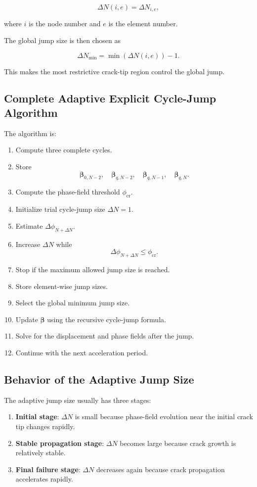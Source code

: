 ﻿\documentclass[11pt,a4paper]{article}
\begin{document}
\[
\Delta N(i,e)
=
\Delta N_{i,e},
\]

where $i$ is the node number and $e$ is the element number.

The global jump size is then chosen as

\[
\Delta N_{\min}
=
\min
\left(
\Delta N(i,e)
\right)
-
1.
\]

This makes the most restrictive crack-tip region control the global jump.

\subsection{Complete Adaptive Explicit Cycle-Jump Algorithm}

The algorithm is:

\begin{enumerate}[leftmargin=*]
    \item Compute three complete cycles.
    \item Store
    \[
    \bm{\beta}_{0,N-2},
    \quad
    \bm{\beta}_{q,N-2},
    \quad
    \bm{\beta}_{q,N-1},
    \quad
    \bm{\beta}_{q,N}.
    \]
    \item Compute the phase-field threshold $\phi_{\mathrm{cr}}$.
    \item Initialize trial cycle-jump size $\Delta N=1$.
    \item Estimate $\Delta \phi_{N+\Delta N}$.
    \item Increase $\Delta N$ while
    \[
    \Delta \phi_{N+\Delta N}\leq \phi_{\mathrm{cr}}.
    \]
    \item Stop if the maximum allowed jump size is reached.
    \item Store element-wise jump sizes.
    \item Select the global minimum jump size.
    \item Update $\bm{\beta}$ using the recursive cycle-jump formula.
    \item Solve for the displacement and phase fields after the jump.
    \item Continue with the next acceleration period.
\end{enumerate}

\subsection{Behavior of the Adaptive Jump Size}

The adaptive jump size usually has three stages:

\begin{enumerate}[leftmargin=*]
    \item \textbf{Initial stage}: $\Delta N$ is small because phase-field evolution near the initial crack tip changes rapidly.
    \item \textbf{Stable propagation stage}: $\Delta N$ becomes large because crack growth is relatively stable.
    \item \textbf{Final failure stage}: $\Delta N$ decreases again because crack propagation accelerates rapidly.
\end{enumerate}
\end{document}
